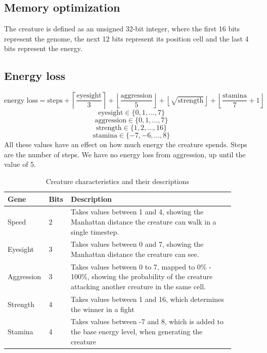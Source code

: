 \documentclass{report}
\begin{document}
\subsection{Memory optimization}
The creature is defined as an unsigned 32-bit integer, where the first 16 bits represent the genome, the next 12 bits represent its position cell and the last 4 bits represent the energy.
\subsection{Energy loss}
\[\text{energy loss}=\text{steps}+\left\lceil\frac{\text{eyesight}}{3}\right\rceil+\left\lfloor\frac{\text{aggression}}{5}\right\rfloor+\left\lfloor\sqrt{\text{strength}}\right\rfloor+\left\lfloor\frac{\text{stamina}}{7}+1\right\rfloor\]
\[\text{eyesight}\in\{0,1,...,7\}\]
\[\text{aggression}\in\{0,1,...,7\}\]
\[\text{strength}\in\{1,2,...,16\}\]
\[\text{stamina}\in\{-7,-6,...,8\}\]
All these values have an effect on how much energy the creature spends. Steps are the number of steps. We have no energy loss from aggression, up until the value of 5.
\begin{table}[H]
\begin{center}
    \begin{tabular}{|p{0.11\linewidth} |p{0.08\linewidth}|p{0.7\linewidth}|}
    \hline
    Gene & Bits & Description  \\\hline
    Speed & 2 & Takes values between 1 and 4, showing the Manhattan distance the creature can walk in a single timestep.\\\hline
    Eyesight & 3 & Takes values between 0 and 7, showing the Manhattan distance the creature can see.\\\hline
    Aggression & 3 & Takes values between 0 to 7, mapped to 0\% - 100\%, showing the probability of the creature attacking another creature in the same cell. \\\hline
    Strength & 4 & Takes values between 1 and 16, which determines the winner in a fight \\\hline
    Stamina & 4 & Takes values between -7 and 8, which is added to the base energy level, when generating the creature\\\hline
\end{tabular}
\caption{Creature characteristics and their descriptions}
\end{center}
\end{table}
\end{document}
